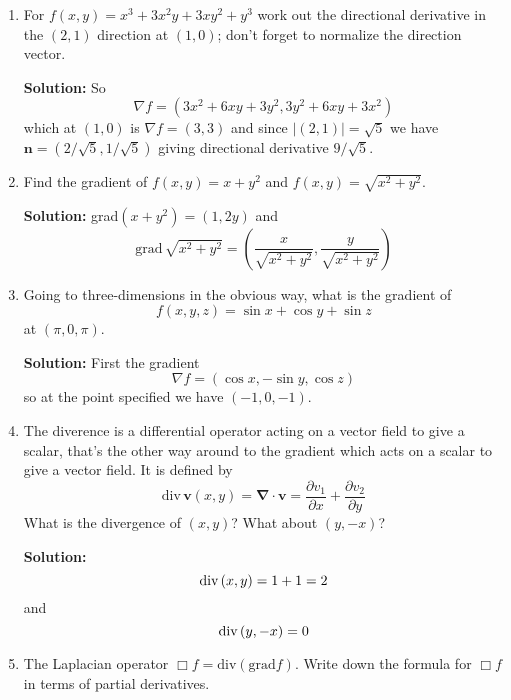 \documentclass[12pt]{article}
\begin{document}
\begin{enumerate}
\item For $f(x,y)=x^3+3x^2y+3xy^2+y^3$ work out the directional
  derivative in the $(2,1)$ direction at $(1,0)$; don't forget to
  normalize the direction vector.

\textbf{Solution: } So
\begin{equation}
\nabla f=(3x^2+6xy+3y^2,3y^2+6xy+3x^2)
\end{equation}
which at $(1,0)$ is $\nabla f=(3,3)$
and since $|(2,1)|=\sqrt{5}$ we have $\mathbf{n}=(2/\sqrt{5},1/\sqrt{5})$ giving directional derivative $9/\sqrt{5}$.

\item Find the gradient of $f(x,y)=x+y^2$ and $f(x,y)=\sqrt{x^2+y^2}$.

\textbf{Solution: } grad$(x+y^2)=(1,2y)$ and 
\begin{equation}
\mbox{grad}\,\sqrt{x^2+y^2}=\left(\frac{x}{\sqrt{x^2+y^2}},\frac{y}{\sqrt{x^2+y^2}}\right)
\end{equation}

\item Going to three-dimensions in the obvious way, what is the
  gradient of 
\begin{equation}
f(x,y,z)=\sin{x}+\cos{y}+\sin{z}
\end{equation}
at $(\pi,0,\pi)$.

\textbf{Solution: } First the gradient
\begin{equation}
\nabla f=(\cos{x},-\sin{y},\cos{z})
\end{equation}
so at the point specified we have $(-1,0,-1)$.

\item The diverence is a differential operator acting on a vector
  field to give a scalar, that's the other way around to the gradient
  which acts on a scalar to give a vector field. It is defined by
  \begin{equation}
    \mbox{div}\,\mathbf{v}(x,y)=\mathbf{\nabla}\cdot\mathbf{v}=\frac{\partial v_1}{\partial x}+\frac{\partial v_2}{\partial y}
\end{equation}
What is the divergence of $(x,y)$? What about $(y,-x)$?

\textbf{Solution: }
\begin{equation}
\mbox{div\,}(x,y)=1+1=2
\end{equation}
and
\begin{equation}
\mbox{div\,}(y,-x)=0
\end{equation}

\item The Laplacian operator $\Box f=\mbox{div}(\mbox{grad}f)$. Write down the formula for $\Box f$ in terms of partial derivatives.


\end{enumerate}
\end{document}
